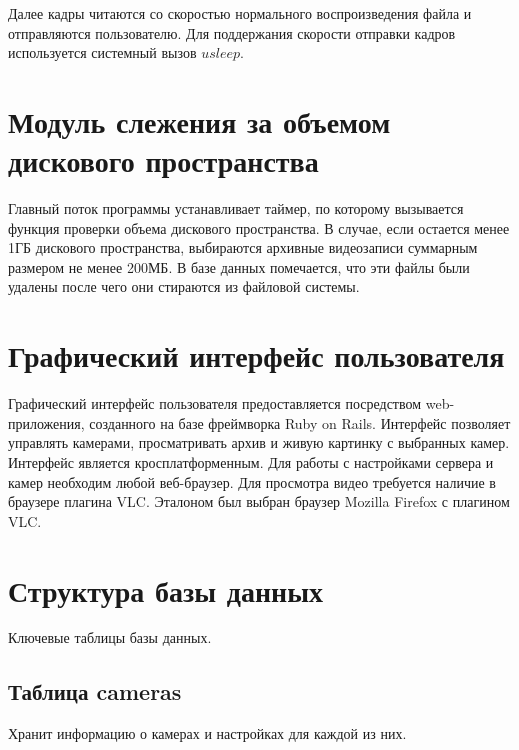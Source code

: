 Далее кадры читаются со скоростью нормального воспроизведения файла и отправляются пользователю.
Для поддержания скорости отправки кадров используется системный вызов $usleep$.


\section{Модуль слежения за объемом дискового пространства}
Главный поток программы устанавливает таймер, по которому вызывается функция проверки объема дискового
пространства. В случае, если остается менее 1ГБ дискового пространства, выбираются архивные видеозаписи
суммарным размером не менее 200МБ. В базе данных помечается, что эти файлы были удалены после чего они
стираются из файловой системы.

\section{Графический интерфейс пользователя}
Графический интерфейс пользователя предоставляется посредством web-приложения, созданного на базе
фреймворка Ruby on Rails. Интерфейс позволяет управлять камерами, просматривать архив и
живую картинку с выбранных камер. Интерфейс является кросплатформенным. Для работы с настройками
сервера и камер необходим любой веб-браузер. Для просмотра видео требуется наличие в
браузере плагина VLC.
Эталоном был выбран браузер Mozilla Firefox с плагином VLC.

\section{Структура базы данных }
Ключевые таблицы базы данных.

\subsection{Таблица cameras}
Хранит информацию о камерах и настройках для каждой из них.

